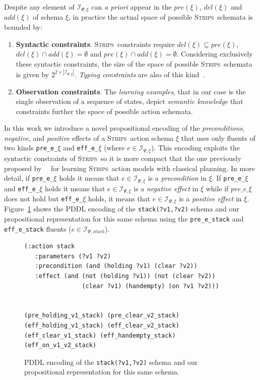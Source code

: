 \documentclass{article}
\newcommand{\strips}{\textsc{Strips}}
\begin{document}
Despite any element of ${\mathcal I}_{\Psi,\xi}$ can {\em a priori} appear in the $pre(\xi)$, $del(\xi)$ and $add(\xi)$ of schema $\xi$, in practice the actual space of possible \strips\ schemata is bounded by:
\begin{enumerate}
\item {\bf Syntactic constraints}. \strips\ constraints require $del(\xi)\subseteq pre(\xi)$, $del(\xi)\cap add(\xi)=\emptyset$ and $pre(\xi)\cap add(\xi)=\emptyset$. Considering exclusively these syntactic constraints, the size of the space of possible \strips\ schemata is given by $2^{2\times|{\mathcal I}_{\Psi,\xi}|}$. {\em Typing constraints} are also of this kind~\cite{mcdermott1998pddl}.
\item {\bf Observation constraints}. The {\em learning examples}, that in our case is the single observation of a sequence of states, depict {\em semantic knowledge} that constraints further the space of possible action schemata.
\end{enumerate}

In this work we introduce a novel propositional encoding of the {\em preconditions}, {\em negative}, and {\em positive} effects of a \strips\ action schema $\xi$ that uses only fluents of two kinds {\tt\small pre\_e\_$\xi$} and {\tt\small eff\_e\_$\xi$} (where $e\in{\mathcal I}_{\Psi,\xi}$). This encoding exploits the syntactic constraints of \strips\, so it is more compact that the one previously proposed by~\citeauthor{aineto2018learning}~\citeyear{aineto2018learning} for learning \strips\ action models with classical planning. In more detail, if {\tt\small pre\_e\_$\xi$} holds it means that $e\in{\mathcal I}_{\Psi,\xi}$ is a {\em precondition} in $\xi$. If {\tt\small pre\_e\_$\xi$} and {\tt\small eff\_e\_$\xi$} holds it means that $e\in{\mathcal I}_{\Psi,\xi}$ is a {\em negative effect} in $\xi$ while if $pre\_e\_\xi$ does not hold but {\tt\small eff\_e\_$\xi$} holds, it means that $e\in{\mathcal I}_{\Psi,\xi}$ is a {\em positive effect} in $\xi$. Figure~\ref{fig:propositional} shows the PDDL encoding of the {\tt\small stack(?v1,?v2)} schema and our propositional representation for this same schema using the {\tt\small pre\_e\_stack} and {\tt\small eff\_e\_stack} fluents ($e\in{\mathcal I}_{\Psi,stack}$).

\begin{figure}
  \begin{tiny}
  \begin{verbatim}
(:action stack
   :parameters (?v1 ?v2)
   :precondition (and (holding ?v1) (clear ?v2))
   :effect (and (not (holding ?v1)) (not (clear ?v2))
                (clear ?v1) (handempty) (on ?v1 ?v2)))


(pre_holding_v1_stack) (pre_clear_v2_stack)
(eff_holding_v1_stack) (eff_clear_v2_stack)
(eff_clear_v1_stack) (eff_handempty_stack) (eff_on_v1_v2_stack)
  \end{verbatim}
  \end{tiny}
 \caption{\small PDDL encoding of the {\tt\small stack(?v1,?v2)} schema and our propositional representation for this same schema.}
\label{fig:propositional}
\end{figure}
\end{document}
